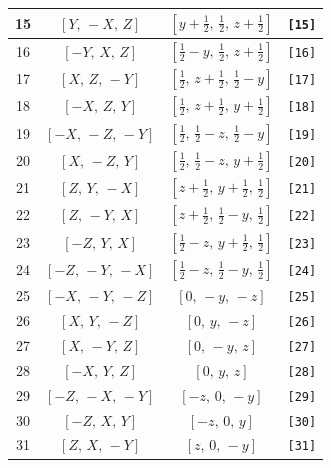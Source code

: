 \documentclass[fleqn,8pt]{jsarticle}
\begin{document}
\begin{longtable}{cccc}
15 & $\left[ Y,\, - X,\, Z \right]$ & $\left[ y + \frac{1}{2},\, \frac{1}{2},\, z + \frac{1}{2} \right]$ & {\tt [15]} \\ \hline
16 & $\left[ - Y,\, X,\, Z \right]$ & $\left[ \frac{1}{2} - y,\, \frac{1}{2},\, z + \frac{1}{2} \right]$ & {\tt [16]} \\ \hline
17 & $\left[ X,\, Z,\, - Y \right]$ & $\left[ \frac{1}{2},\, z + \frac{1}{2},\, \frac{1}{2} - y \right]$ & {\tt [17]} \\ \hline
18 & $\left[ - X,\, Z,\, Y \right]$ & $\left[ \frac{1}{2},\, z + \frac{1}{2},\, y + \frac{1}{2} \right]$ & {\tt [18]} \\ \hline
19 & $\left[ - X,\, - Z,\, - Y \right]$ & $\left[ \frac{1}{2},\, \frac{1}{2} - z,\, \frac{1}{2} - y \right]$ & {\tt [19]} \\ \hline
20 & $\left[ X,\, - Z,\, Y \right]$ & $\left[ \frac{1}{2},\, \frac{1}{2} - z,\, y + \frac{1}{2} \right]$ & {\tt [20]} \\ \hline
21 & $\left[ Z,\, Y,\, - X \right]$ & $\left[ z + \frac{1}{2},\, y + \frac{1}{2},\, \frac{1}{2} \right]$ & {\tt [21]} \\ \hline
22 & $\left[ Z,\, - Y,\, X \right]$ & $\left[ z + \frac{1}{2},\, \frac{1}{2} - y,\, \frac{1}{2} \right]$ & {\tt [22]} \\ \hline
23 & $\left[ - Z,\, Y,\, X \right]$ & $\left[ \frac{1}{2} - z,\, y + \frac{1}{2},\, \frac{1}{2} \right]$ & {\tt [23]} \\ \hline
24 & $\left[ - Z,\, - Y,\, - X \right]$ & $\left[ \frac{1}{2} - z,\, \frac{1}{2} - y,\, \frac{1}{2} \right]$ & {\tt [24]} \\ \hline
25 & $\left[ - X,\, - Y,\, - Z \right]$ & $\left[ 0,\, - y,\, - z \right]$ & {\tt [25]} \\ \hline
26 & $\left[ X,\, Y,\, - Z \right]$ & $\left[ 0,\, y,\, - z \right]$ & {\tt [26]} \\ \hline
27 & $\left[ X,\, - Y,\, Z \right]$ & $\left[ 0,\, - y,\, z \right]$ & {\tt [27]} \\ \hline
28 & $\left[ - X,\, Y,\, Z \right]$ & $\left[ 0,\, y,\, z \right]$ & {\tt [28]} \\ \hline
29 & $\left[ - Z,\, - X,\, - Y \right]$ & $\left[ - z,\, 0,\, - y \right]$ & {\tt [29]} \\ \hline
30 & $\left[ - Z,\, X,\, Y \right]$ & $\left[ - z,\, 0,\, y \right]$ & {\tt [30]} \\ \hline
31 & $\left[ Z,\, X,\, - Y \right]$ & $\left[ z,\, 0,\, - y \right]$ & {\tt [31]} \\ \hline

\end{longtable}
\end{document}
